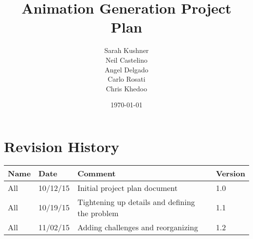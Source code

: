 \documentclass{article}
\begin{document}
\title{Animation Generation Project Plan}
\author{Sarah Kushner \\
		Neil Castelino \\
		Angel Delgado \\
		Carlo Rosati \\
		Chris Khedoo}
\date{\today}
\maketitle

\pagebreak
\tableofcontents
\pagebreak

\section{Revision History}
\begin{table}[hp]
\centering
\begin{tabular}{|l|l|l|l|}
\hline
Name 		& Date	 		& 	Comment	 								& 	Version	 \\ \hline
All		& 10/12/15		& 	Initial project plan document			&  	1.0 		 \\ \hline
All		& 10/19/15		& 	Tightening up details and defining the problem			&  	1.1 		 \\ \hline
All		& 11/02/15		& 	Adding challenges and reorganizing			&  	1.2 		 \\ \hline
\end{tabular}
\end{table}

\pagebreak
















\end{document}
